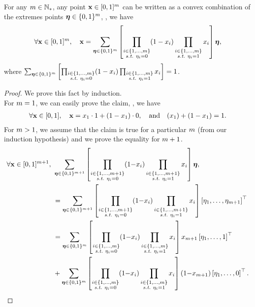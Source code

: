\begin{noaddcontents}
\begin{lemma}
For any $m\in\mathbb{N}_{*}$, any point $\mathbf{x}\in [0,1]^m$ can be written as a convex combination of the extremes points $\boldsymbol{\eta}\in\{0,1\}^m$, \ie, we have
\begin{align*}
    \forall \mathbf{x}\in[0, 1]^m,\quad \mathbf{x}=\sum_{\boldsymbol{\eta}\in\{0,1\}^m} \left[ \prod_{\substack{i\in\{1,\dots,m\}\\ \text{{\it s.t.}}\ \eta_i=0}} (1-x_i)\prod_{\substack{i\in\{1,\dots,m\}\\ \text{{\it s.t.}}\ \eta_i=1}} x_i \right]\boldsymbol{\eta},
\end{align*}
where $\sum_{\boldsymbol{\eta}\in\{0,1\}^m} \left[ \prod_{\substack{i\in\{1,\dots,m\}\\ \text{{\it s.t.}}\ \eta_i=0}} (1-x_i)\prod_{\substack{i\in\{1,\dots,m\}\\ \text{{\it s.t.}}\ \eta_i=1}} x_i \right]=1$.
\label{ap:pac-bayes:lemma:extreme}
\end{lemma}
\begin{proof}
We prove this fact by induction.\\
For $m=1$, we can easily prove the claim, \ie, we have 
\begin{align*}
    \forall \mathbf{x}\in[0, 1],\quad \mathbf{x} = x_1 \cdot 1 + (1-x_1)\cdot 0, \quad\text{and}\quad  (x_1)+(1-x_1)=1.
\end{align*}
For $m>1$, we assume that the claim is true for a particular $m$ (from our induction hypothesis) and we prove the equality for $m+1$.
\begin{align*}
    \forall \mathbf{x}\in[0, 1]^{m+1},\ &\sum_{\boldsymbol{\eta}\in\{0,1\}^{m+1}} \left[ \prod_{\substack{i\in\{1,\dots,m+1\}\\ \text{{\it s.t.}}\ \eta_i=0}} (1{-}x_i)\prod_{\substack{i\in\{1,\dots,m+1\}\\ \text{{\it s.t.}}\ \eta_i=1}} x_i \right]\boldsymbol{\eta},\\
    &= \sum_{\boldsymbol{\eta}\in\{0,1\}^{m+1}} \left[ \prod_{\substack{i\in\{1,\dots,m+1\}\\ \text{{\it s.t.}}\ \eta_i=0}} (1{-}x_i)\prod_{\substack{i\in\{1,\dots,m+1\}\\ \text{{\it s.t.}}\ \eta_i=1}} x_i \right]\left[\eta_1, \dots, \eta_{m+1}\right]^\top\\
    &= \sum_{\boldsymbol{\eta}\in\{0,1\}^{m}} \left[ \prod_{\substack{i\in\{1,\dots,m\}\\ \text{{\it s.t.}}\ \eta_i=0}} (1{-}x_i)\prod_{\substack{i\in\{1,\dots,m\}\\ \text{{\it s.t.}}\ \eta_i=1}} x_i \right] x_{m+1}\left[\eta_1, \dots, 1\right]^\top\\
    &+ \sum_{\boldsymbol{\eta}\in\{0,1\}^{m}} \left[ \prod_{\substack{i\in\{1,\dots,m\}\\ \text{{\it s.t.}}\ \eta_i=0}} (1{-}x_i)\prod_{\substack{i\in\{1,\dots,m\}\\ \text{{\it s.t.}}\ \eta_i=1}} x_i \right] (1{-}x_{m+1})\left[\eta_1, \dots, 0\right]^\top.
\end{align*}


\end{proof}
\end{noaddcontents}
